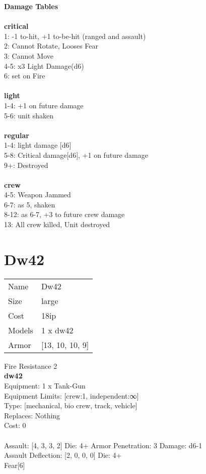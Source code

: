 {\bf Damage Tables} \\
\ \\ {\bf critical } \\
1: -1 to-hit, +1 to-be-hit (ranged and assault) \\
2: Cannot Rotate, Looses Fear \\
3: Cannot Move \\
4-5: x3 Light Damage(d6) \\
6: set on Fire \\
\ \\ {\bf light } \\
1-4: +1 on future damage \\
5-6: unit shaken \\
\ \\ {\bf regular } \\
1-4: light damage [d6] \\
5-8: Critical damage[d6], +1 on future damage \\
9+: Destroyed \\
\ \\ {\bf crew } \\
4-5: Weapon Jammed \\
6-7: as 5, shaken \\
8-12: as 6-7, +3 to future crew damage \\
13: All crew killed, Unit destroyed \\










\pagebreak\pagebreak

\section{ Dw42 }

\begin{tabular}{ll}
  Name & Dw42 \\
  Size & large\\
  Cost & 18ip\\
  Models & 1 x dw42\\
  Armor & [13, 10, 10, 9]\\
\end{tabular}

\noindent Fire Resistance 2\\ 


{\bf dw42 } \\
Equipment: 1 x Tank-Gun \\
Equipment Limits: [crew:1, independent:∞] \\
Type: [mechanical, bio crew, track, vehicle] \\
Replaces: Nothing \\
Cost: 0\\
\ \\
Assault: [4, 3, 3, 2] Die: 4+ Armor Penetration: 3 Damage: d6-1 \\
Assault Deflection: [2, 0, 0, 0] Die: 4+\\
\indent Fear[6]\\ 
 
